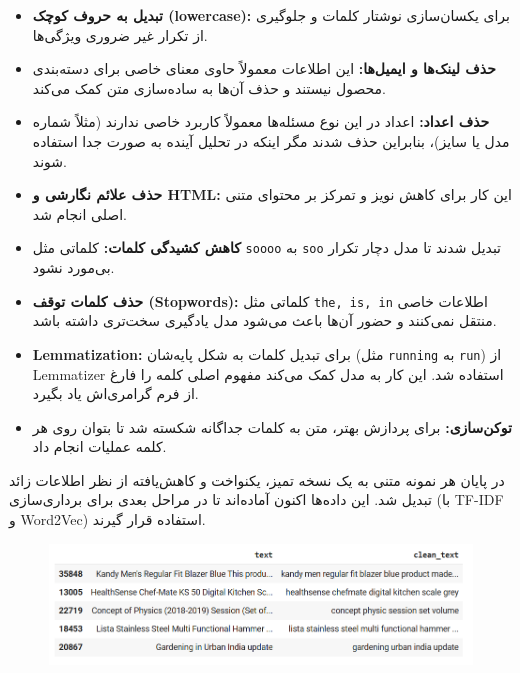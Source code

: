 \documentclass[a4paper,12pt]{article}
\begin{document}
	\begin{itemize}
		\item \textbf{تبدیل به حروف کوچک (lowercase):} برای یکسان‌سازی نوشتار کلمات و جلوگیری از تکرار غیر ضروری ویژگی‌ها.
		
		\item \textbf{حذف لینک‌ها و ایمیل‌ها:} این اطلاعات معمولاً حاوی معنای خاصی برای دسته‌بندی محصول نیستند و حذف آن‌ها به ساده‌سازی متن کمک می‌کند.
		
		\item \textbf{حذف اعداد:} اعداد در این نوع مسئله‌ها معمولاً کاربرد خاصی ندارند (مثلاً شماره مدل یا سایز)، بنابراین حذف شدند مگر اینکه در تحلیل آینده به صورت جدا استفاده شوند.
		
		\item \textbf{حذف علائم نگارشی و HTML:} این کار برای کاهش نویز و تمرکز بر محتوای متنی اصلی انجام شد.
		
		\item \textbf{کاهش کشیدگی کلمات:} کلماتی مثل \texttt{soooo} به \texttt{soo} تبدیل شدند تا مدل دچار تکرار بی‌مورد نشود.
		
		\item \textbf{حذف کلمات توقف (Stopwords):} کلماتی مثل \texttt{the, is, in} اطلاعات خاصی منتقل نمی‌کنند و حضور آن‌ها باعث می‌شود مدل یادگیری سخت‌تری داشته باشد.
		
		\item \textbf{Lemmatization:} برای تبدیل کلمات به شکل پایه‌شان (مثل \texttt{running} به \texttt{run}) از Lemmatizer استفاده شد. این کار به مدل کمک می‌کند مفهوم اصلی کلمه را فارغ از فرم گرامری‌اش یاد بگیرد.
		
		\item \textbf{توکن‌سازی:} برای پردازش بهتر، متن به کلمات جداگانه شکسته شد تا بتوان روی هر کلمه عملیات انجام داد.
	\end{itemize}
	

	در پایان هر نمونه متنی به یک نسخه تمیز، یکنواخت و کاهش‌یافته از نظر اطلاعات زائد تبدیل شد. این داده‌ها اکنون آماده‌اند تا در مراحل بعدی برای برداری‌سازی (با TF-IDF و Word2Vec) استفاده قرار گیرند.
	\begin{figure}[h]
		\centering
		\includegraphics[width=1\textwidth]{1.png}
	\end{figure}
	\FloatBarrier
	
\end{document}
